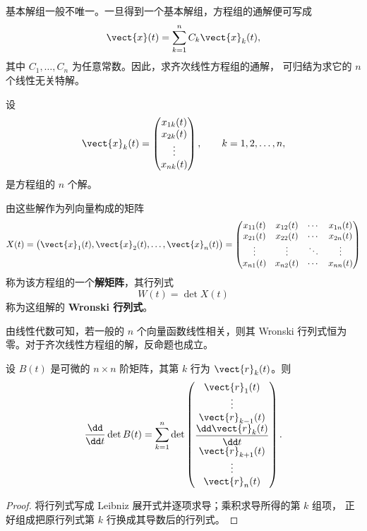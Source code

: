 基本解组一般不唯一。一旦得到一个基本解组，方程组的通解便可写成
\[
	\vect{x}(t)
	=\sum_{k=1}^{n}C_k\vect{x}_k(t),
\]
其中 $C_1,\ldots,C_n$ 为任意常数。因此，求齐次线性方程组的通解，
可归结为求它的 $n$ 个线性无关特解。

设
\[
	\vect{x}_k(t)=
	\begin{pmatrix}
		x_{1k}(t)\\
		x_{2k}(t)\\
		\vdots\\
		x_{nk}(t)
	\end{pmatrix},
	\qquad k=1,2,\ldots,n,
\]
是方程组的 $n$ 个解。

\begin{definition}\label{def:解矩阵与Wronski行列式}
	由这些解作为列向量构成的矩阵
	\[
		X(t)
		=\bigl(\vect{x}_1(t),\vect{x}_2(t),\ldots,\vect{x}_n(t)\bigr)
		=
		\begin{pmatrix}
			x_{11}(t) & x_{12}(t) & \cdots & x_{1n}(t)\\
			x_{21}(t) & x_{22}(t) & \cdots & x_{2n}(t)\\
			\vdots    & \vdots    & \ddots & \vdots\\
			x_{n1}(t) & x_{n2}(t) & \cdots & x_{nn}(t)
		\end{pmatrix}
	\]
	称为该方程组的一个\textbf{解矩阵}，其行列式
	\[
		W(t)=\det X(t)
	\]
	称为这组解的 \textbf{Wronski 行列式}。
\end{definition}

由线性代数可知，若一般的 $n$ 个向量函数线性相关，则其 Wronski
行列式恒为零。对于齐次线性方程组的解，反命题也成立。

\begin{lemma}\label{lem:行列式的导数}
	设 $B(t)$ 是可微的 $n\times n$ 阶矩阵，其第 $k$ 行为
	$\vect{r}_k(t)$。则
	\[
		\dfrac{\dd}{\dd t}\det B(t)
		=
		\sum_{k=1}^{n}
		\det
		\begin{pmatrix}
			\vect{r}_1(t)\\
			\vdots\\
			\vect{r}_{k-1}(t)\\
			\dfrac{\dd\vect{r}_k(t)}{\dd t}\\
			\vect{r}_{k+1}(t)\\
			\vdots\\
			\vect{r}_n(t)
		\end{pmatrix}.
	\]
\end{lemma}

\begin{proof}
	将行列式写成 Leibniz 展开式并逐项求导；乘积求导所得的第 $k$ 组项，
	正好组成把原行列式第 $k$ 行换成其导数后的行列式。
\end{proof}

